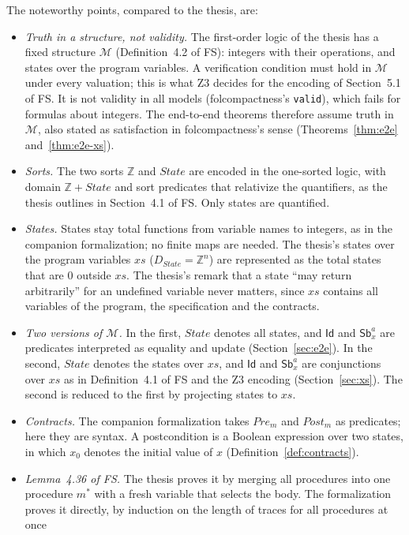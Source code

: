 \documentclass[11pt]{article}
\newcommand{\Id}{\mathsf{Id}}
\newcommand{\Sb}[2]{\mathsf{Sb}^{#1}_{#2}}
\newcommand{\State}{\mathit{State}}
\newcommand{\Pre}{\mathit{Pre}}
\newcommand{\Post}{\mathit{Post}}
\newcommand{\M}{\mathcal{M}}
\newcommand{\Z}{\mathbb{Z}}
\newcommand{\Th}[1]{#1 of FS}
\theoremstyle{plain}
\theoremstyle{definition}
\theoremstyle{remark}
\begin{document}
The noteworthy points, compared to the thesis, are:
\begin{itemize}
\item \emph{Truth in a structure, not validity.} The first-order logic of
  the thesis has a fixed structure $\M$ (\Th{Definition~4.2}): integers
  with their operations, and states over the program variables. A
  verification condition must hold in $\M$ under every valuation; this is
  what Z3 decides for the encoding of \Th{Section~5.1}. It is not
  validity in all models (folcompactness's \texttt{valid}), which fails
  for formulas about integers. The end-to-end theorems therefore assume
  truth in $\M$, also stated as satisfaction in folcompactness's sense
  (Theorems~\ref{thm:e2e} and~\ref{thm:e2e-xs}).
\item \emph{Sorts.} The two sorts $\Z$ and $\State$ are encoded in the
  one-sorted logic, with domain $\Z + \State$ and sort predicates that
  relativize the quantifiers, as the thesis outlines in
  \Th{Section~4.1}. Only states are quantified.
\item \emph{States.} States stay total functions from variable names to
  integers, as in the companion formalization; no finite maps are needed.
  The thesis's states over the program variables $xs$ ($D_{\State} =
  \Z^n$) are represented as the total states that are $0$ outside $xs$.
  The thesis's remark that a state ``may return arbitrarily'' for an
  undefined variable never matters, since $xs$ contains all variables of
  the program, the specification and the contracts.
\item \emph{Two versions of $\M$.} In the first, $\State$ denotes all
  states, and $\Id$ and $\Sb{a}{x}$ are predicates interpreted as equality
  and update (Section~\ref{sec:e2e}). In the second, $\State$ denotes the
  states over $xs$, and $\Id$ and $\Sb{a}{x}$ are conjunctions over $xs$
  as in \Th{Definition~4.1} and the Z3 encoding (Section~\ref{sec:xs}).
  The second is reduced to the first by projecting states to $xs$.
\item \emph{Contracts.} The companion formalization takes $\Pre_m$ and
  $\Post_m$ as predicates; here they are syntax. A postcondition is a
  Boolean expression over two states, in which $x_0$ denotes the initial
  value of $x$ (Definition~\ref{def:contracts}).
\item \emph{\Th{Lemma~4.36}.} The thesis proves it by merging all
  procedures into one procedure $m^*$ with a fresh variable that selects
  the body. The formalization proves it directly, by induction on the
  length of traces for all procedures at once

\end{itemize}
\end{document}
